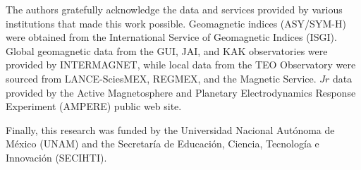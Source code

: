 \documentclass[a4paper]{article}
\theoremstyle{plain}
\theoremstyle{definition}
\begin{document}
The authors gratefully acknowledge the data and services provided by various institutions that made this work possible. Geomagnetic indices (ASY/SYM-H) were obtained from the International Service of Geomagnetic Indices (ISGI). Global geomagnetic data from the GUI, JAI, and KAK observatories were provided by INTERMAGNET, while local data from the TEO Observatory were sourced from LANCE-SciesMEX, REGMEX, and the Magnetic Service. $Jr$ data provided by the Active Magnetosphere and Planetary Electrodynamics Response Experiment (AMPERE) public web site. %


Finally, this research was funded by the Universidad Nacional Autónoma de México (UNAM) and the Secretaría de Educación, Ciencia, Tecnología e Innovación (SECIHTI).
	
	
	\appendix
	
	
	
\end{document}
